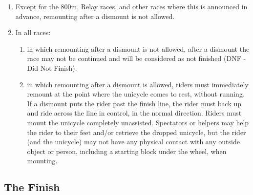 \begin{enumerate}[leftmargin=1.5em,labelsep=*]
	\item Except for the 800m, Relay races, and other races where this is announced in advance, remounting after a 
  dismount is not allowed.
	
	\item In all races:
	
	\begin{enumerate}[label*=\arabic*,leftmargin=1.5em,labelsep=*]
		\item in which remounting after a dismount is not allowed, after a dismount the race may not be continued 
    and will be considered as not finished (DNF - Did Not Finish).
		
		\item in which remounting after a dismount is allowed, riders must immediately remount at the point where 
    the unicycle comes to rest, without running.
		If a dismount puts the rider past the finish line, the rider must back up and ride across the line in control, 
    in the normal direction.
		Riders must mount the unicycle completely unassisted.
		Spectators or helpers may help the rider to their feet and/or retrieve the dropped unicycle, 
    but the rider (and the unicycle) may not have any physical contact with any outside object or person, 
    including a starting block under the wheel, when mounting.
	\end{enumerate}
\end{enumerate}

\subsection{The Finish \label{sec:track_racing_finish}}

